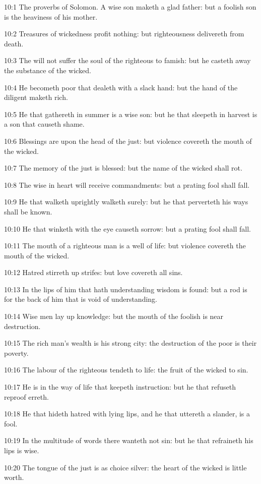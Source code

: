 10:1 The proverbs of Solomon. A wise son maketh a glad father: but a
foolish son is the heaviness of his mother.

10:2 Treasures of wickedness profit nothing: but righteousness
delivereth from death.

10:3 The \LORD will not suffer the soul of the righteous to famish: but
he casteth away the substance of the wicked.

10:4 He becometh poor that dealeth with a slack hand: but the hand of
the diligent maketh rich.

10:5 He that gathereth in summer is a wise son: but he that sleepeth
in harvest is a son that causeth shame.

10:6 Blessings are upon the head of the just: but violence covereth
the mouth of the wicked.

10:7 The memory of the just is blessed: but the name of the wicked
shall rot.

10:8 The wise in heart will receive commandments: but a prating fool
shall fall.

10:9 He that walketh uprightly walketh surely: but he that perverteth
his ways shall be known.

10:10 He that winketh with the eye causeth sorrow: but a prating fool
shall fall.

10:11 The mouth of a righteous man is a well of life: but violence
covereth the mouth of the wicked.

10:12 Hatred stirreth up strifes: but love covereth all sins.

10:13 In the lips of him that hath understanding wisdom is found: but
a rod is for the back of him that is void of understanding.

10:14 Wise men lay up knowledge: but the mouth of the foolish is near
destruction.

10:15 The rich man's wealth is his strong city: the destruction of the
poor is their poverty.

10:16 The labour of the righteous tendeth to life: the fruit of the
wicked to sin.

10:17 He is in the way of life that keepeth instruction: but he that
refuseth reproof erreth.

10:18 He that hideth hatred with lying lips, and he that uttereth a
slander, is a fool.

10:19 In the multitude of words there wanteth not sin: but he that
refraineth his lips is wise.

10:20 The tongue of the just is as choice silver: the heart of the
wicked is little worth.

